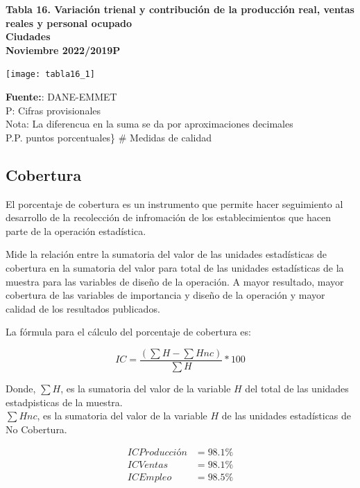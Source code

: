 \documentclass[
]{article}
\begin{document}
\textbf{Tabla 16. Variación trienal y contribución de la producción
real, ventas reales y personal ocupado}\\
\textbf{Ciudades}\\
\textbf{Noviembre 2022/2019P}

\begin{center}\texttt{[image: tabla16\_1]} \end{center}

\textbf{Fuente:}: DANE-EMMET\\
P: Cifras provisionales\\
Nota: La diferencua en la suma se da por aproximaciones decimales\\
P.P. puntos porcentuales\} \# Medidas de calidad

\hypertarget{cobertura}{%
\subsection{Cobertura}\label{cobertura}}

El porcentaje de cobertura es un instrumento que permite hacer
seguimiento al desarrollo de la recolección de infromación de los
establecimientos que hacen parte de la operación estadística.

Mide la relación entre la sumatoria del valor de las unidades
estadísticas de cobertura en la sumatoria del valor para total de las
unidades estadísticas de la muestra para las variables de diseño de la
operación. A mayor resultado, mayor cobertura de las variables de
importancia y diseño de la operación y mayor calidad de los resultados
publicados.

La fórmula para el cálculo del porcentaje de cobertura es:

\begin{equation*}
IC = \frac{(\sum H - \sum Hnc)}{\sum H}*100
\end{equation*}

Donde, \(\sum H\), es la sumatoria del valor de la variable \(H\) del
total de las unidades estadpisticas de la muestra.\\
\(\sum Hnc\), es la sumatoria del valor de la variable \(H\) de las
unidades estadísticas de No Cobertura.

\begin{align*}
ICProducción &= 98.1\%\\
ICVentas &= 98.1\%\\
ICEmpleo &= 98.5\%\\
\end{align*}
\end{document}
